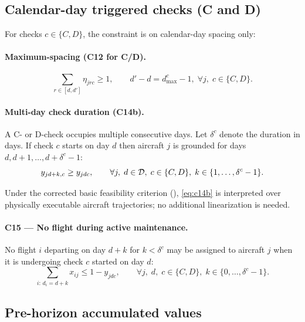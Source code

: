 \subsection{Calendar-day triggered checks (C and D)}

For checks $c \in \{C, D\}$, the constraint is on calendar-day spacing only:

\paragraph{Maximum-spacing (C12 for C/D).}
\begin{equation}\label{eq:c12_cd}
  \sum_{r \in [d,d']} \eta_{jrc} \ge 1,
  \qquad d'-d = d^c_{\max}-1,\; \forall j,\; c \in \{C,D\}.
\end{equation}

\paragraph{Multi-day check duration (C14b).}
A C- or D-check occupies multiple consecutive days.  Let $\delta^c$ denote
the duration in days.  If check $c$ starts on day $d$ then aircraft $j$ is
grounded for days $d, d+1, \ldots, d+\delta^c-1$:
\begin{equation}\label{eq:c14b}
  y_{jd+k,c} \ge y_{jdc}, \qquad
  \forall j,\; d \in \mathcal{D},\; c \in \{C,D\},\; k \in \{1,\ldots,\delta^c-1\}.
\end{equation}

Under the corrected basic feasibility criterion
(), \eqref{eq:c14b} is interpreted over physically
executable aircraft trajectories; no additional linearization is needed.

\paragraph{C15 — No flight during active maintenance.}
No flight $i$ departing on day $d+k$ for $k < \delta^c$ may be assigned to
aircraft $j$ when it is undergoing check $c$ started on day $d$:
\begin{equation}\label{eq:c15}
  \sum_{i:\, d_i = d+k} x_{ij} \le 1 - y_{jdc},
  \qquad \forall j,\; d,\; c \in \{C,D\},\; k \in \{0,\ldots,\delta^c-1\}.
\end{equation}

\subsection{Pre-horizon accumulated values}

